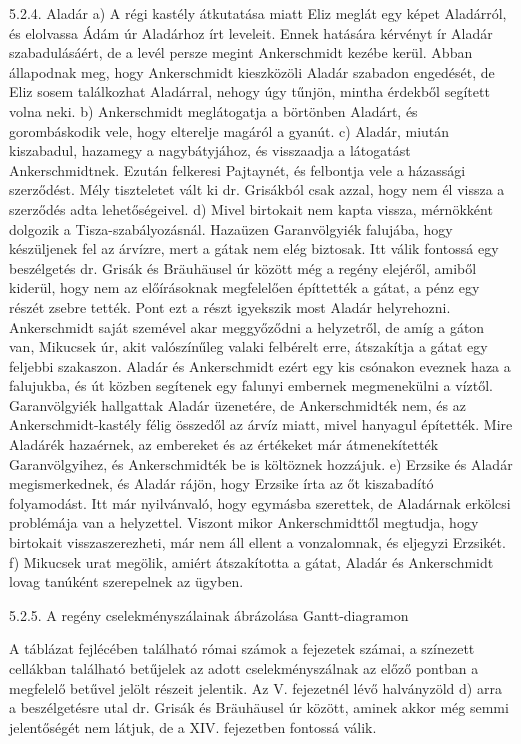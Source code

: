 \documentclass[a4paper,12pt]{thesis-ekf}
\begin{document}
    5.2.4. Aladár
    a) A régi kastély átkutatása miatt Eliz meglát egy képet Aladárról, és elolvassa Ádám úr Aladárhoz írt leveleit. Ennek hatására kérvényt ír Aladár szabadulásáért, de a levél persze megint Ankerschmidt kezébe kerül. Abban állapodnak meg, hogy Ankerschmidt kieszközöli Aladár szabadon engedését, de Eliz sosem találkozhat Aladárral, nehogy úgy tűnjön, mintha érdekből segített volna neki.
    b) Ankerschmidt meglátogatja a börtönben Aladárt, és gorombáskodik vele, hogy elterelje magáról a gyanút.
    c) Aladár, miután kiszabadul, hazamegy a nagybátyjához, és visszaadja a látogatást Ankerschmidtnek. Ezután felkeresi Pajtaynét, és felbontja vele a házassági szerződést. Mély tiszteletet vált ki dr. Grisákból csak azzal, hogy nem él vissza a szerződés adta lehetőségeivel.
    d) Mivel birtokait nem kapta vissza, mérnökként dolgozik a Tisza-szabályozásnál. Hazaüzen Garanvölgyiék falujába, hogy készüljenek fel az árvízre, mert a gátak nem elég biztosak. Itt válik fontossá egy beszélgetés dr. Grisák és Bräuhäusel úr között még a regény elejéről, amiből kiderül, hogy nem az előírásoknak megfelelően építtették a gátat, a pénz egy részét zsebre tették. Pont ezt a részt igyekszik most Aladár helyrehozni. Ankerschmidt saját szemével akar meggyőződni a helyzetről, de amíg a gáton van, Mikucsek úr, akit valószínűleg valaki felbérelt erre, átszakítja a gátat egy feljebbi szakaszon. Aladár és Ankerschmidt ezért egy kis csónakon eveznek haza a falujukba, és út közben segítenek egy falunyi embernek megmenekülni a víztől. Garanvölgyiék hallgattak Aladár üzenetére, de Ankerschmidték nem, és az Ankerschmidt-kastély félig összedől az árvíz miatt, mivel hanyagul építették. Mire Aladárék hazaérnek, az embereket és az értékeket már átmenekítették Garanvölgyihez, és Ankerschmidték be is költöznek hozzájuk.
    e) Erzsike és Aladár megismerkednek, és Aladár rájön, hogy Erzsike írta az őt kiszabadító folyamodást. Itt már nyilvánvaló, hogy egymásba szerettek, de Aladárnak erkölcsi problémája van a helyzettel. Viszont mikor Ankerschmidttől megtudja, hogy birtokait visszaszerezheti, már nem áll ellent a vonzalomnak, és eljegyzi Erzsikét.
    f) Mikucsek urat megölik, amiért átszakította a gátat, Aladár és Ankerschmidt lovag tanúként szerepelnek az ügyben.

    5.2.5. A regény cselekményszálainak ábrázolása Gantt-diagramon

    A táblázat fejlécében található római számok a fejezetek számai, a színezett cellákban található betűjelek az adott cselekményszálnak az előző pontban a megfelelő betűvel jelölt részeit jelentik. Az V. fejezetnél lévő halványzöld d) arra a beszélgetésre utal dr. Grisák és Bräuhäusel úr között, aminek akkor még semmi jelentőségét nem látjuk, de a XIV. fejezetben fontossá válik.
\end{document}
